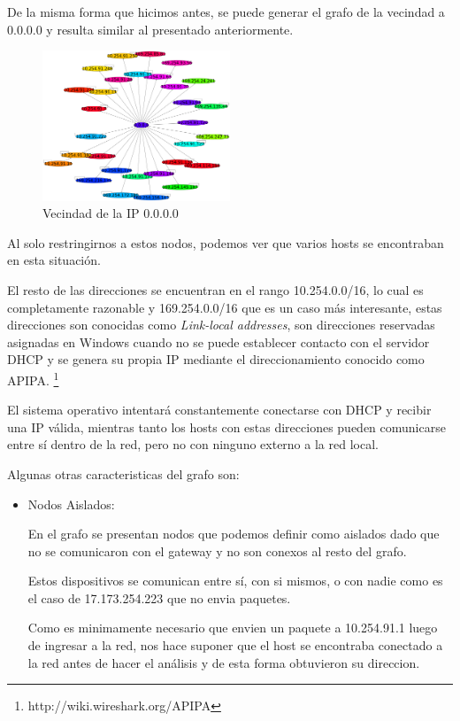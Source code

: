     \par De la misma forma que hicimos antes, se puede generar el grafo de la vecindad a 0.0.0.0 y resulta similar al presentado anteriormente.
    
\begin{figure}[H]
		\centering
		\includegraphics[width=0.5\textwidth]{img/graph/escenario_3/0000_aislado.eps}
		\caption{Vecindad de la IP 0.0.0.0}
		\label{fig:0_escenario3}
\end{figure}

	\par Al solo restringirnos a estos nodos, podemos ver que varios hosts se encontraban en esta situación.
\vspace{6 mm}

	\par El resto de las direcciones se encuentran en el rango 10.254.0.0/16, lo cual es completamente razonable y 169.254.0.0/16 que es un caso más interesante, estas direcciones son conocidas como \emph{Link-local addresses}, son direcciones reservadas asignadas en Windows cuando no se puede establecer contacto con el servidor DHCP y se genera su propia IP mediante el direccionamiento conocido como APIPA. \footnote{http://wiki.wireshark.org/APIPA}

	\par El sistema operativo intentará constantemente conectarse con DHCP y recibir una IP válida, mientras tanto los hosts con estas direcciones pueden comunicarse entre sí dentro de la red, pero no con ninguno externo a la red local.
\vspace{6 mm}
	\par Algunas otras caracteristicas del grafo son:

\begin{itemize}

\item Nodos Aislados:

\par En el grafo se presentan nodos que podemos definir como aislados dado que no se comunicaron con el gateway y no son conexos  al resto del grafo.
    
\par Estos dispositivos se comunican entre sí, con si mismos, o con nadie como es el caso de 17.173.254.223 que no envia paquetes.

\par  Como es minimamente necesario que envien un paquete a 10.254.91.1 luego de ingresar a la red, nos hace suponer que el host se encontraba conectado a la red antes de hacer el análisis y de esta forma obtuvieron su direccion.  
\end{itemize}

